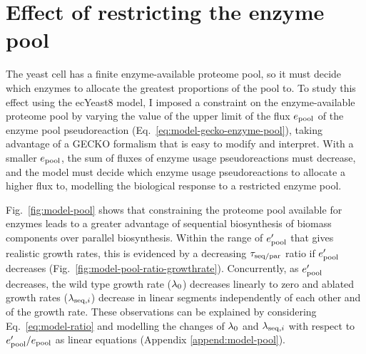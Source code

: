 \section{Effect of restricting the enzyme pool}
\label{sec:model-pool}

The yeast cell has a finite enzyme-available proteome pool, so it must decide which enzymes to allocate the greatest proportions of the pool to.
To study this effect using the ecYeast8 model, I imposed a constraint on the enzyme-available proteome pool by varying the value of the upper limit of the flux $e_{\mathrm{pool}}$ of the enzyme pool pseudoreaction (Eq.\ \ref{eq:model-gecko-enzyme-pool}), taking advantage of a GECKO formalism that is easy to modify and interpret.
With a smaller $e_{\mathrm{pool}}$, the sum of fluxes of enzyme usage pseudoreactions must decrease, and the model must decide which enzyme usage pseudoreactions to allocate a higher flux to, modelling the biological response to a restricted enzyme pool.

Fig.\ \ref{fig:model-pool} shows that constraining the proteome pool available for enzymes leads to a greater advantage of sequential biosynthesis of biomass components over parallel biosynthesis.
Within the range of $e_{\mathrm{pool}}^{\prime}$ that gives realistic growth rates, this is evidenced by a decreasing $\tau_{\mathrm{seq}/\mathrm{par}}$ ratio if $e_{\mathrm{pool}}^{\prime}$ decreases (Fig.\ \ref{fig:model-pool-ratio-growthrate}).
Concurrently, as $e_{\mathrm{pool}}^{\prime}$ decreases, the wild type growth rate ($\lambda_{0}$) decreases linearly to zero and ablated growth rates ($\lambda_{\mathrm{seq},i}$) decrease in linear segments independently of each other and of the growth rate.
These observations can be explained by considering Eq.\ \ref{eq:model-ratio} and modelling the changes of $\lambda_{0}$ and $\lambda_{\mathrm{seq},i}$ with respect to $e_{\mathrm{pool}}^{\prime}/e_{\mathrm{pool}}$ as linear equations (Appendix \ref{append:model-pool}).

